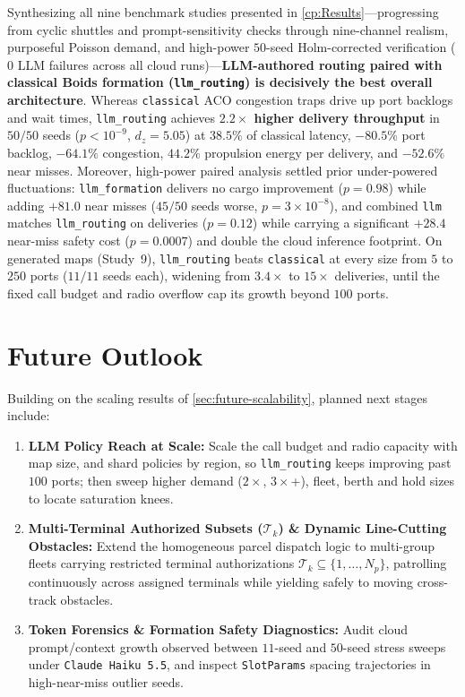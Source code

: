 \documentclass[11pt,a4paper,oneside]{report}
\begin{document}
Synthesizing all nine benchmark studies presented in \autoref{cp:Results}---progressing from cyclic shuttles and prompt-sensitivity checks through nine-channel realism, purposeful Poisson demand, and high-power $50$-seed Holm-corrected verification ($0$ LLM failures across all cloud runs)---\textbf{LLM-authored routing paired with classical Boids formation (\texttt{llm\_routing}) is decisively the best overall architecture}. Whereas \texttt{classical} ACO congestion traps drive up port backlogs and wait times, \texttt{llm\_routing} achieves \textbf{$2.2\times$ higher delivery throughput} in $50/50$ seeds ($p<10^{-9}$, $d_z=5.05$) at $38.5\%$ of classical latency, $-80.5\%$ port backlog, $-64.1\%$ congestion, $44.2\%$ propulsion energy per delivery, and $-52.6\%$ near misses. Moreover, high-power paired analysis settled prior under-powered fluctuations: \texttt{llm\_formation} delivers no cargo improvement ($p=0.98$) while adding $+81.0$ near misses ($45/50$ seeds worse, $p=3\times 10^{-8}$), and combined \texttt{llm} matches \texttt{llm\_routing} on deliveries ($p=0.12$) while carrying a significant $+28.4$ near-miss safety cost ($p=0.0007$) and double the cloud inference footprint. On generated maps (Study~9), \texttt{llm\_routing} beats \texttt{classical} at every size from $5$ to $250$ ports ($11/11$ seeds each), widening from $3.4\times$ to $15\times$ deliveries, until the fixed call budget and radio overflow cap its growth beyond $100$ ports.

\section{Future Outlook}
Building on the scaling results of \autoref{sec:future-scalability}, planned next stages include:
\begin{enumerate}
    \item \textbf{LLM Policy Reach at Scale:} Scale the call budget and radio capacity with map size, and shard policies by region, so \texttt{llm\_routing} keeps improving past $100$ ports; then sweep higher demand ($2\times$, $3\times$+), fleet, berth and hold sizes to locate saturation knees.
    \item \textbf{Multi-Terminal Authorized Subsets ($\mathcal{T}_k$) \& Dynamic Line-Cutting Obstacles:} Extend the homogeneous parcel dispatch logic to multi-group fleets carrying restricted terminal authorizations $\mathcal{T}_k \subseteq \{1,\dots,N_p\}$, patrolling continuously across assigned terminals while yielding safely to moving cross-track obstacles.
    \item \textbf{Token Forensics \& Formation Safety Diagnostics:} Audit cloud prompt/context growth observed between $11$-seed and $50$-seed stress sweeps under \texttt{Claude Haiku 5.5}, and inspect \texttt{SlotParams} spacing trajectories in high-near-miss outlier seeds.
\end{enumerate}
\end{document}
